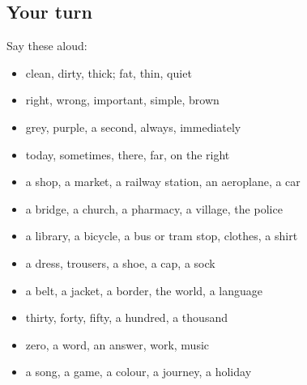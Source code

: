 \subsection*{Your turn}
Say these aloud:

\begin{itemize}
\raggedright
  \item clean, dirty, thick; fat, thin, quiet
  \item right, wrong, important, simple, brown
  \item grey, purple, a second, always, immediately
  \item today, sometimes, there, far, on the right
  \item a shop, a market, a railway station, an aeroplane, a car
  \item a bridge, a church, a pharmacy, a village, the police
  \item a library, a bicycle, a bus or tram stop, clothes, a shirt
  \item a dress, trousers, a shoe, a cap, a sock
  \item a belt, a jacket, a border, the world, a language
  \item thirty, forty, fifty, a hundred, a thousand
  \item zero, a word, an answer, work, music
  \item a song, a game, a colour, a journey, a holiday
\end{itemize}

